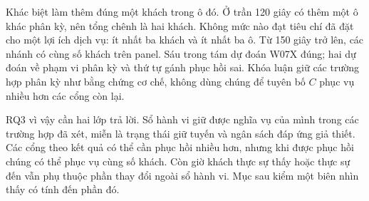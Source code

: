 Khác biệt làm thêm đúng một khách trong ô đó. Ở trần 120 giây có thêm một ô
khác phân kỳ, nên tổng chênh là hai khách. Không mức nào đạt tiêu chí đã đặt
cho một lợi ích dịch vụ: ít nhất ba khách và ít nhất ba ô. Từ 150 giây trở lên,
các nhánh có cùng số khách trên panel. Sáu trong tám dự đoán W07X đúng; hai
dự đoán về phạm vi phân kỳ và thứ tự gánh phục hồi sai. Khóa luận giữ các
trường hợp phân kỳ như bằng chứng cơ chế, không dùng chúng để tuyên bố $C$
phục vụ nhiều hơn các cổng còn lại.

RQ3 vì vậy cần hai lớp trả lời. Sổ hành vi giữ được nghĩa vụ của mình trong
các trường hợp đã xét, miễn là trạng thái giữ tuyến và ngân sách đáp ứng giả
thiết. Các cổng theo kết quả có thể cần phục hồi nhiều hơn, nhưng khi được
phục hồi chúng có thể phục vụ cùng số khách. Còn giờ khách thực sự thấy hoặc
thực sự đến vẫn phụ thuộc phần thay đổi ngoài sổ hành vi. Mục sau kiểm một
biên nhìn thấy có tính đến phần đó.
